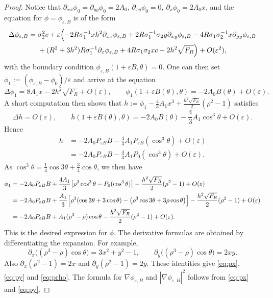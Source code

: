 \documentclass[12pt,reqno]{amsart}
\numberwithin{equation}{section}
\theoremstyle{definition}
\theoremstyle{remark}
\begin{document}
\begin{proof}
Notice that $\partial_{xx}\phi_0=\partial_{yy}\phi_0=2A_0$, $\partial_{xy}\phi_0=0$, $\partial_x\phi_0=2A_0x$, and the equation for $\phi = \phi_{\varepsilon,B}$ is of the form
\begin{equation*} 
\begin{split}
\Delta\phi_{\varepsilon,B}={}&\sigma_2^2c+\varepsilon\Bigl(-2R\sigma_1^{-1}xh^2\partial_{xx}\phi_{\varepsilon,B}+2  R\sigma_1^{-1}\sigma_2y\partial_{xy}\phi_{\varepsilon,B}-4R\sigma_1\sigma_2^{-1}x\partial_{yy}\phi_{\varepsilon,B}\\
&
+(R^2+3h^2)R\sigma_1^{-1}\partial_x\phi_{\varepsilon,B} 
+4R \sigma_1\sigma_2xc-2h^2\sqrt{F_R}\Bigr)
+O(\varepsilon^2),
\end{split}
\end{equation*}
with the boundary condition  $ \phi_{\varepsilon,B}(1+\varepsilon B,\theta)=0 $. One can then set $\phi_1 := (\phi_{\varepsilon,B}-\phi_0)/\varepsilon$ and arrive at the equation
\[
\Delta\phi_1 = 8A_1 x -2h^2\sqrt{F_R}+ O(\varepsilon) , \qquad
\phi_1(1+\varepsilon B(\theta),\theta) = -2A_0 B(\theta) + O(\varepsilon) .
\]
	 A short computation then shows that $h := \phi_1 - \frac43 A_1 x^3+\frac{h^2\sqrt{F_R}}{2}(\rho^2-1)$ satisfies
	\[
	\Delta h = O(\varepsilon) , \qquad
	h(1+\varepsilon B(\theta),\theta) = -2A_0 B(\theta) - \frac43 A_1 \cos^3\theta + O(\varepsilon) .
	\]
	Hence
	\begin{align*}
	h &= -2A_0 P_{\varepsilon B} B - \frac43 A_1 P_{\varepsilon B}(\cos^3\theta) + O(\varepsilon) \\
	&= -2A_0 P_{\varepsilon B} B - \frac43 A_1 P_0(\cos^3\theta) + O(\varepsilon) .
	\end{align*}
	As $\cos^3\theta = \frac14\cos 3\theta + \frac34\cos\theta$, we then have
	\begin{align*}
	\phi_1 &= -2A_0 P_{\varepsilon B} B
	+ \frac{4A_1}{3} \bigl[ \rho^3\cos^3\theta - P_0(\cos^3\theta) \bigr]-\frac{h^2\sqrt{F_R}}{2}(\rho^2-1) + O(\varepsilon) \\
	&= -2A_0 P_{\varepsilon B} B
	+ \frac{A_1}{3}\Bigl[ \rho^3(\cos 3\theta+3\cos\theta)
	- \bigl( \rho^3\cos 3\theta + 3\rho\cos\theta \bigr) \Bigr]-\frac{h^2\sqrt{F_R}}{2}(\rho^2-1) + O(\varepsilon) \\
	&= -2A_0 P_{\varepsilon B} B + A_1(\rho^3-\rho)\cos\theta -\frac{h^2\sqrt{F_R}}{2}(\rho^2-1)+ O(\varepsilon) .
	\end{align*}
	This is the desired expression for $\phi$. 
The derivative formulas are obtained by differentiating the expansion.  For example,
	\[
	\partial_x\bigl((\rho^3-\rho)\cos\theta\bigr)=3x^2+y^2-1,
	\qquad
	\partial_y\bigl((\rho^3-\rho)\cos\theta\bigr)=2xy.
	\]
	Also $\partial_x(\rho^2-1)=2x$ and $\partial_y(\rho^2-1)=2y$.  These identities give \eqref{eq:px}, \eqref{eq:py} and \eqref{eq:prho}.  The formula for $ \nabla\phi_{\varepsilon,B} $ and $|\nabla\phi_{\varepsilon,B}|^2$ follows  from \eqref{eq:px} and \eqref{eq:py}.
\end{proof}
\end{document}
